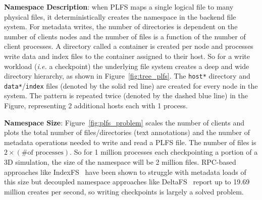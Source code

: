 

\textbf{Namespace Description}: when PLFS maps a single logical file to many
physical files, it deterministically creates the namespace in the backend file
system.  For metadata writes, the number of directories is dependent on the
number of clients nodes and the number of files is a function of the number of
client processes.  A directory called a container is created per node and
processes write data and index files to the container assigned to their host.
So for a write workload ({\it i.e.} a checkpoint) the underlying file system
creates a deep and wide directory hierarchy, as shown in
Figure~\ref{fig:tree_plfs}.  The \texttt{host*} directory and
\texttt{data*}/\texttt{index} files (denoted by the solid red line) are created
for every node in the system. The pattern is repeated twice (denoted by the
dashed blue line) in the Figure, representing 2 additional hosts each with 1
process.

\textbf{Namespace Size}: Figure~\ref{fig:plfs_problem} scales the number of
clients and plots the total number of files/directories (text annotations) and
the number of metadata operations needed to write and read a PLFS file.  The
number of files is \(2\times(\text{\# of processes})\).  So for 1 million
processes each checkpointing a portion of a 3D simulation, the size of the
namespace will be 2 million files.  RPC-based approaches like
IndexFS~\cite{ren:sc2014-indexfs} have been shown to struggle with metadata
loads of this size but decoupled namespace approaches like
DeltaFS~\cite{zheng:pdsw2015-deltafs} report up to 19.69 million creates per
second, so writing checkpoints is largely a solved problem.

